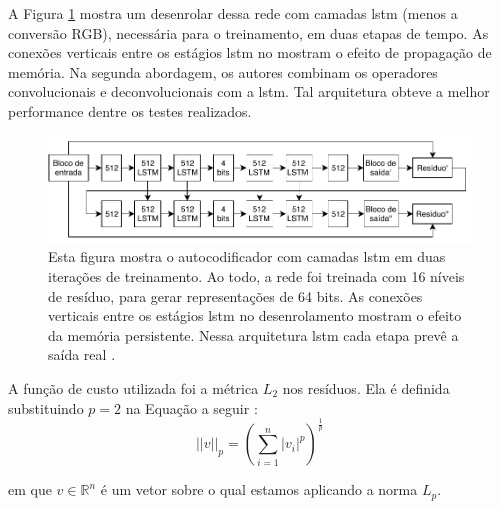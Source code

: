 A Figura \ref{fig:toderici_ae_lstm} mostra um desenrolar dessa rede com camadas \acrshort{lstm} (menos a conversão RGB), necessária para o treinamento, em duas etapas de tempo. As conexões verticais entre os estágios \acrshort{lstm} no mostram o efeito de propagação de memória. 
Na segunda abordagem, os autores combinam os operadores convolucionais e deconvolucionais com a \acrshort{lstm}. Tal arquitetura obteve a melhor performance dentre os testes realizados. %


\begin{figure}[h]
	\centering
	\includegraphics[width=1.00\textwidth]{figuras/ae_lstm.pdf}
	\caption[Autocodificador residual com camadas \acrshort{lstm}]{ Esta figura mostra o autocodificador com camadas  \acrshort{lstm} em duas iterações de treinamento.  Ao todo, a rede foi treinada com 16 níveis de resíduo, para gerar representações de 64 bits. As conexões verticais entre os estágios \acrshort{lstm} no desenrolamento mostram o efeito da memória persistente. Nessa arquitetura \acrshort{lstm} cada etapa prevê a saída real \cite{Variable2016Toderici}.}
	\label{fig:toderici_ae_lstm}
\end{figure}


A função de custo utilizada foi a métrica $L_2$ nos resíduos. Ela é definida substituindo $p=2$ na Equação a seguir \cite{nie2010efficient}:
\begin{equation}
||v||_p = \left ( \sum_{i=1}^n |v_i|^p \right)^{\frac{1}{p}}  
\end{equation}

\noindent em que $v \in \mathbb{R}^n$ é um vetor sobre o qual estamos aplicando a norma $L_p$. 




